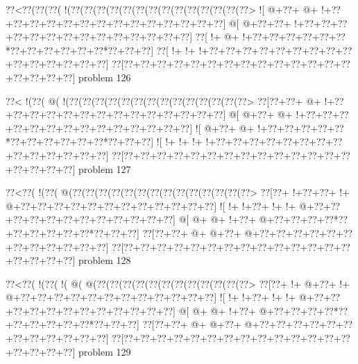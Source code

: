 \vbox{\vbox{\goo
\0??<\0??(\0??(\0??(\- !(\0??(\0??(\0??(\0??(\0??(\0??(\0??(\0??(\0??(\0??(\0??(\0??(\0??(\0??>
\- ![\- @+\0??+\- @+\- !+\0??+\0??+\0??+\0??+\0??+\0??+\0??+\0??+\0??+\0??+\0??+\0??+\0??+\0??]
\- @[\- @+\0??+\0??+\- !+\0??+\0??+\0??+\0??+\0??+\0??+\0??+\0??+\0??+\0??+\0??+\0??+\0??+\0??]
\0??[\- !+\- @+\- !+\0??+\0??+\0??+\0??+\0??+\0??*\0??+\0??+\0??+\0??+\0??+\0??*\0??+\0??+\0??]
\0??[\- !+\- !+\- !+\0??+\0??+\0??+\0??+\0??+\0??+\0??+\0??+\0??+\0??+\0??+\0??+\0??+\0??+\0??]
\0??[\0??+\0??+\0??+\0??+\0??+\0??+\0??+\0??+\0??+\0??+\0??+\0??+\0??+\0??+\0??+\0??+\0??+\0??]
}
\hfil problem 126\hfil\break
}



\vbox{\vbox{\goo
\0??<\- !(\0??(\- @(\- !(\0??(\0??(\0??(\0??(\0??(\0??(\0??(\0??(\0??(\0??(\0??(\0??(\0??(\0??>
\0??[\0??+\0??+\- @+\- !+\0??+\0??+\0??+\0??+\0??+\0??+\0??+\0??+\0??+\0??+\0??+\0??+\0??+\0??]
\- @[\- @+\0??+\- @+\- !+\0??+\0??+\0??+\0??+\0??+\0??+\0??+\0??+\0??+\0??+\0??+\0??+\0??+\0??]
\- ![\- @+\0??+\- @+\- !+\0??+\0??+\0??+\0??+\0??*\0??+\0??+\0??+\0??+\0??+\0??*\0??+\0??+\0??]
\- ![\- !+\- !+\- !+\- !+\0??+\0??+\0??+\0??+\0??+\0??+\0??+\0??+\0??+\0??+\0??+\0??+\0??+\0??]
\0??[\0??+\0??+\0??+\0??+\0??+\0??+\0??+\0??+\0??+\0??+\0??+\0??+\0??+\0??+\0??+\0??+\0??+\0??]
}
\hfil problem 127\hfil\break
}



\vbox{\vbox{\goo
\0??<\0??(\- !(\0??(\- @(\0??(\0??(\0??(\0??(\0??(\0??(\0??(\0??(\0??(\0??(\0??(\0??(\0??(\0??>
\0??[\0??+\- !+\0??+\0??+\- !+\- @+\0??+\0??+\0??+\0??+\0??+\0??+\0??+\0??+\0??+\0??+\0??+\0??]
\- ![\- !+\- !+\0??+\- !+\- !+\- @+\0??+\0??+\0??+\0??+\0??+\0??+\0??+\0??+\0??+\0??+\0??+\0??]
\- @[\- @+\- @+\- !+\0??+\- @+\0??+\0??+\0??+\0??*\0??+\0??+\0??+\0??+\0??+\0??*\0??+\0??+\0??]
\0??[\0??+\0??+\- @+\- @+\0??+\- @+\0??+\0??+\0??+\0??+\0??+\0??+\0??+\0??+\0??+\0??+\0??+\0??]
\0??[\0??+\0??+\0??+\0??+\0??+\0??+\0??+\0??+\0??+\0??+\0??+\0??+\0??+\0??+\0??+\0??+\0??+\0??]
}
\hfil problem 128\hfil\break
}



\vbox{\vbox{\goo
\0??<\0??(\- !(\0??(\- !(\- @(\- @(\0??(\0??(\0??(\0??(\0??(\0??(\0??(\0??(\0??(\0??(\0??(\0??>
\0??[\0??+\- !+\- @+\0??+\- !+\- @+\0??+\0??+\0??+\0??+\0??+\0??+\0??+\0??+\0??+\0??+\0??+\0??]
\- ![\- !+\- !+\0??+\- !+\- !+\- @+\0??+\0??+\0??+\0??+\0??+\0??+\0??+\0??+\0??+\0??+\0??+\0??]
\- @[\- @+\- @+\- !+\0??+\- @+\0??+\0??+\0??+\0??*\0??+\0??+\0??+\0??+\0??+\0??*\0??+\0??+\0??]
\0??[\0??+\0??+\- @+\- @+\0??+\- @+\0??+\0??+\0??+\0??+\0??+\0??+\0??+\0??+\0??+\0??+\0??+\0??]
\0??[\0??+\0??+\0??+\0??+\0??+\0??+\0??+\0??+\0??+\0??+\0??+\0??+\0??+\0??+\0??+\0??+\0??+\0??]
}
\hfil problem 129\hfil\break
}



